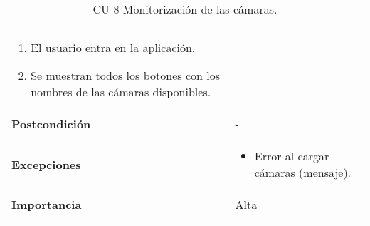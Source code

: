 \begin{longtable}[h!]{@{}ll@{}}
\begin{minipage}[t]{0.71\columnwidth}
\begin{enumerate}
\def\labelenumi{\arabic{enumi}.}
\tightlist
\item
  El usuario entra en la aplicación.
\item
  Se muestran todos los botones con los nombres de las cámaras disponibles.
\end{enumerate}\strut
\end{minipage}\tabularnewline
\begin{minipage}[t]{0.23\columnwidth}\raggedright\strut
\textbf{Postcondición}\strut
\end{minipage} & \begin{minipage}[t]{0.71\columnwidth}\raggedright\strut
-\strut
\end{minipage}\tabularnewline
\begin{minipage}[t]{0.23\columnwidth}\raggedright\strut
\textbf{Excepciones}\strut
\end{minipage} & \begin{minipage}[t]{0.71\columnwidth}\raggedright\strut
\begin{itemize}
\tightlist
\item
  Error al cargar cámaras (mensaje).
\end{itemize}\strut
\end{minipage}\tabularnewline
\begin{minipage}[t]{0.23\columnwidth}\raggedright\strut
\textbf{Importancia}\strut
\end{minipage} & \begin{minipage}[t]{0.71\columnwidth}\raggedright\strut
Alta\strut
\end{minipage}\tabularnewline
\bottomrule
\caption{CU-8 Monitorización de las cámaras.}
\end{longtable}


